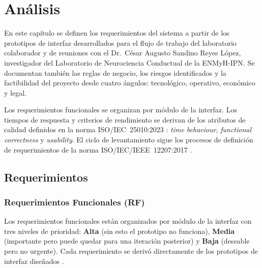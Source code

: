
\chapter{Análisis}

En este capítulo se definen los requerimientos del sistema a partir de los prototipos
de interfaz desarrollados para el flujo de trabajo del laboratorio colaborador y de
reuniones con el Dr.\ César Augusto Sandino Reyes López, investigador del Laboratorio
de Neurociencia Conductual de la ENMyH-IPN. Se documentan
también las reglas de negocio, los riesgos identificados y la factibilidad del proyecto
desde cuatro ángulos: tecnológico, operativo, económico y legal.

Los requerimientos funcionales se organizan por módulo de la interfaz. Los tiempos de
respuesta y criterios de rendimiento se derivan de los atributos de calidad definidos
en la norma ISO/IEC~25010:2023 \cite{iso25010}: \textit{time behaviour},
\textit{functional correctness} y \textit{usability}. El ciclo de levantamiento sigue
los procesos de definición de requerimientos de la norma ISO/IEC/IEEE~12207:2017
\cite{iso12207}.

\section{Requerimientos}

\subsection{Requerimientos Funcionales (RF)}

Los requerimientos funcionales están organizados por módulo de la interfaz con tres
niveles de prioridad: \textbf{Alta} (sin esto el prototipo no funciona),
\textbf{Media} (importante pero puede quedar para una iteración posterior) y
\textbf{Baja} (deseable pero no urgente). Cada requerimiento se derivó directamente
de los prototipos de interfaz diseñados \cite{pressman2014,sommerville2016}.


